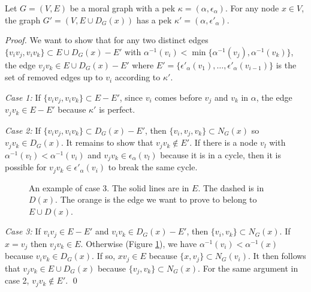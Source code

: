 \begin{lemma}
\label{lm:rose_lm1}
Let $G=(V,E)$ be a moral graph with a pek $\kappa=(\alpha,\epsilon_{\alpha})$. For any node $x \in V$, the graph $G'=(V,E\cup D_G(x))$ has a pek $\kappa'=(\alpha, \epsilon'_{\alpha})$. 
\end{lemma}  
\begin{proof}
We want to show that for any two distinct edges $\{v_iv_j, v_iv_k\} \subset E\cup D_G(x)-E'$ with $\alpha^{-1}(v_i) < \min \{\alpha^{-1}(v_j), \alpha^{-1}(v_k)\}$, the edge $v_jv_k \in E\cup D_G(x)-E'$ where $E' = \{\epsilon'_{\alpha}(v_1),\dots,\epsilon'_{\alpha}(v_{i-1})\}$ is the set of removed edges up to $v_i$ according to $\kappa'$.

\textit{Case 1:} If $\{v_iv_j, v_iv_k\} \subset E-E'$, since $v_i$ comes before $v_j$ and $v_k$ in $\alpha$, the edge $v_jv_k\in E-E'$ because $\kappa'$ is perfect.

\textit{Case 2:} If $\{v_iv_j, v_iv_k\} \subset D_G(x)-E'$, then $\{v_i,v_j,v_k\} \subset N_G(x)$ so $v_jv_k \in D_G(x)$. It remains to show that $v_jv_k \notin E'$. If there is a node $v_l$ with $\alpha^{-1}(v_l) < \alpha^{-1}(v_i)$ and $v_jv_k\in \epsilon_{\alpha}(v_l)$ because it is in a cycle, then it is possible for $v_jv_k \in \epsilon'_{\alpha}(v_i)$ to break the same cycle. 
\begin{figure}[H]
\centering
{}
\caption{An example of case 3. The solid lines are in $E$. The dashed is in $D(x)$. The orange is the edge we want to prove to belong to $E\cup D(x)$.}
\label{fg:case3}
\end{figure}
\textit{Case 3:} If $v_iv_j \in E-E'$ and $v_iv_k \in D_G(x)-E'$, then $\{v_i,v_k\}\subset N_G(x)$. If $x=v_j$ then $v_jv_k \in E$. Otherwise (Figure \ref{fg:case3}), we have $\alpha^{-1}(v_i) < \alpha^{-1}(x)$ because $v_iv_k \in D_G(x)$. If so, $xv_j \in E$ because $\{x, v_j\} \subset N_G(v_i)$. It then follows that $v_jv_k \in E\cup D_G(x)$ because $\{v_j,v_k\} \subset N_G(x)$. For the same argument in case 2, $v_jv_k \notin E'$. \qed
\end{proof}

